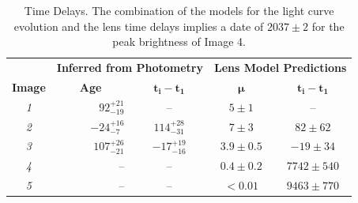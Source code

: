 \documentclass[12pt]{article}
\begin{document}
\clearpage

\begin{table}
\centering
\begin{tabular}{crc|cc}
    \multicolumn{1}{c}{}&
    \multicolumn{2}{c}{\textbf{Inferred from Photometry}}&\multicolumn{2}{c}{\textbf{Lens Model Predictions}}\\
    \multicolumn{1}{c}{\textbf{Image}} &\multicolumn{1}{c}{\textbf{Age}} &\multicolumn{1}{c}{$\mathbf{t_i-t_1}$}&\multicolumn{1}{c}{$\mathbf{\mu}$}
    &\multicolumn{1}{c}{$\mathbf{t_i-t_1}$}\\
    
\midrule
\textit{1}  & $92^{+21}_{-19}$ & -- & $5\pm1$ & --\\
\textit{2} & $-24^{+16}_{-7}$ & $114^{+28}_{-31}$ & $7\pm3$ & $82\pm62$ \\
\textit{3} & $107^{+26}_{-21}$ & $-17^{+19}_{-16}$ &$3.9\pm0.5$  & $-19\pm34$ \\
\textit{4} & -- & -- & $0.4\pm0.2$ & $7742\pm540$\\
\textit{5} & -- & -- & $<0.01$ & $9463\pm770$\\



\end{tabular}
\caption{\label{tab:time_delays}Time Delays.  The combination of the models for the light curve evolution and the lens time delays implies a date of $2037\pm2$ for the peak brightness of Image 4.}
\end{table}

\clearpage



\end{document}
